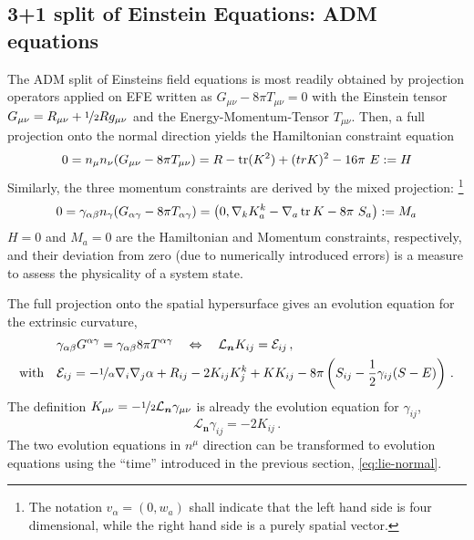 \subsection[ADM equations]{3+1 split of Einstein Equations: ADM 
equations}\label{sec:3p1-split-efe}
The ADM split of Einsteins field equations is most readily obtained by
projection operators applied on EFE written as $G_{\mu\nu} - 8\pi T_{\mu\nu} = 0$
with the Einstein tensor 
$G_{\mu\nu} = R_{\mu\nu} + \nicefrac 12 R g_{\mu\nu}$ and the
Energy-Momentum-Tensor $T_{\mu\nu}$. Then, a full projection onto the normal
direction yields the Hamiltonian constraint equation
\begin{equation}\label{eq:adm-system.hamiltonian}
0 = n_\mu n_\nu (G_{\mu\nu} - 8\pi T_{\mu\nu} ) = R - \operatorname{tr}(K^2) + (tr K)^2 - 16\pi~E
:= H
\end{equation}
Similarly, the three momentum constraints are derived by the
mixed projection:
\footnote{The notation $v_\alpha=(0,w_a)$ shall indicate that the 
  left hand side is four dimensional, while the right hand side is a purely
  spatial vector.}
\begin{equation}\label{eq:adm-system.momentum}
0 = \gamma_{\alpha\beta} n_\gamma (G_{\alpha\gamma} - 8\pi T_{\alpha\gamma} )
  = \left( 0, \nabla_k K^k_a - \nabla_a \operatorname{tr} K - 8\pi ~ S_a \right)
  := M_a
\end{equation}
$H=0$ and $M_a=0$
are the Hamiltonian and Momentum constraints, respectively, and their
deviation from zero (due to numerically introduced errors) is a measure to
assess the physicality of a system state.

The full projection onto the spatial hypersurface gives an evolution equation
for the extrinsic curvature,%
\begin{align}\label{eq:adm-system.kextr}
&  \gamma_{\alpha\beta} G^{\alpha\gamma} =
  \gamma_{\alpha\beta} 8\pi T^{\alpha\gamma} 
  \quad\Leftrightarrow\quad
  \mathcal{L}_{\boldsymbol n} K_{ij} = \mathcal E_{ij}
  \,,
  \\
  \text{with}\quad
&   \mathcal E_{ij} = 
  - \nicefrac 1\alpha \nabla_i \nabla_j \alpha + 
  R_{ij} - 2 K_{ij} K^k_j + K K_{ij}
  - 8\pi \left( 
  S_{ij}  - \frac 12 \gamma_{ij} (S-E) \right)
  \nonumber
  \,.
\end{align}
The definition $K_{\mu\nu} = -\nicefrac 12 \mathcal L_{\boldsymbol n} 
\gamma_{\mu\nu}$ is already the evolution equation for $\gamma_{ij}$,
\begin{equation}\label{eq:adm-system.gamma}
\mathcal L_{\boldsymbol n} \gamma_{ij} = -2 K_{ij} \,.
\end{equation}
The two evolution equations in $n^\mu$ direction can be transformed to
evolution equations using the ``time'' introduced in the previous section,
\ie \eqref{eq:lie-normal}.

